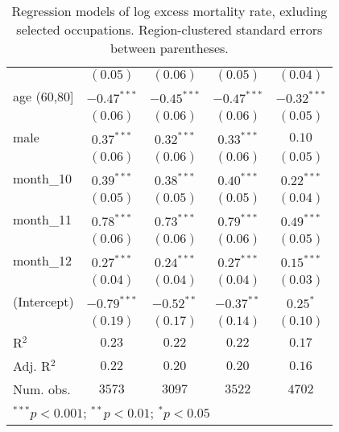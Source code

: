 \begin{table}[h!]
\begin{center}
\begin{tabular}{l c c c c}
               & $(0.05)$      & $(0.06)$      & $(0.05)$      & $(0.04)$      \\
age (60,80]    & $-0.47^{***}$ & $-0.45^{***}$ & $-0.47^{***}$ & $-0.32^{***}$ \\
               & $(0.06)$      & $(0.06)$      & $(0.06)$      & $(0.05)$      \\
male           & $0.37^{***}$  & $0.32^{***}$  & $0.33^{***}$  & $0.10$        \\
               & $(0.06)$      & $(0.06)$      & $(0.06)$      & $(0.05)$      \\
month\_10      & $0.39^{***}$  & $0.38^{***}$  & $0.40^{***}$  & $0.22^{***}$  \\
               & $(0.05)$      & $(0.05)$      & $(0.05)$      & $(0.04)$      \\
month\_11      & $0.78^{***}$  & $0.73^{***}$  & $0.79^{***}$  & $0.49^{***}$  \\
               & $(0.06)$      & $(0.06)$      & $(0.06)$      & $(0.05)$      \\
month\_12      & $0.27^{***}$  & $0.24^{***}$  & $0.27^{***}$  & $0.15^{***}$  \\
               & $(0.04)$      & $(0.04)$      & $(0.04)$      & $(0.03)$      \\
(Intercept)    & $-0.79^{***}$ & $-0.52^{**}$  & $-0.37^{**}$  & $0.25^{*}$    \\
               & $(0.19)$      & $(0.17)$      & $(0.14)$      & $(0.10)$      \\
\hline
R$^2$          & $0.23$        & $0.22$        & $0.22$        & $0.17$        \\
Adj. R$^2$     & $0.22$        & $0.20$        & $0.20$        & $0.16$        \\
Num. obs.      & $3573$        & $3097$        & $3522$        & $4702$        \\
\hline
\multicolumn{5}{l}{\scriptsize{$^{***}p<0.001$; $^{**}p<0.01$; $^{*}p<0.05$}}
\end{tabular}
\caption{Regression models of log excess mortality rate, exluding selected occupations. Region-clustered standard errors between parentheses.}
\label{tab:altoccmodels}
\end{center}
\end{table}
